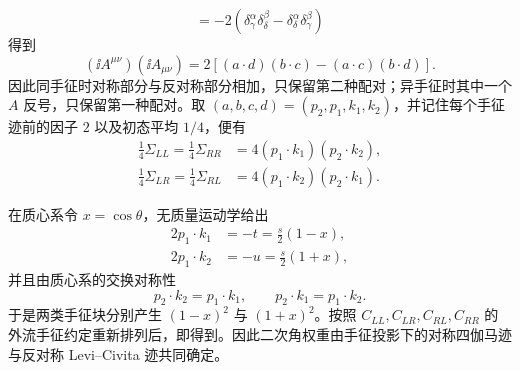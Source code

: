 \begin{derivation}[手征系数的自旋求和与角分布]
\begin{equation*}
=-2\left(\delta^\alpha_{\gamma}\delta^\beta_{\delta}
-\delta^\alpha_{\delta}\delta^\beta_{\gamma}\right)
\end{equation*}
得到
\begin{equation*}
(\ii A^{\mu\nu})(\ii A_{\mu\nu})
=2\left[(a\cdot d)(b\cdot c)-(a\cdot c)(b\cdot d)\right].
\end{equation*}
因此同手征时对称部分与反对称部分相加，只保留第二种配对；异手征时其中一个 $A$ 反号，只保留第一种配对。取
$(a,b,c,d)=(p_2,p_1,k_1,k_2)$，并记住每个手征迹前的因子 $2$ 以及初态平均 $1/4$，便有
\begin{align*}
\frac14\Sigma_{LL}
=\frac14\Sigma_{RR}
&=4(p_1\cdot k_1)(p_2\cdot k_2),\\
\frac14\Sigma_{LR}
=\frac14\Sigma_{RL}
&=4(p_1\cdot k_2)(p_2\cdot k_1).
\end{align*}

在质心系令 $x=\cos\theta$，无质量运动学给出
\begin{align*}
2p_1\cdot k_1&=-t=\frac{s}{2}(1-x),\\
2p_1\cdot k_2&=-u=\frac{s}{2}(1+x),
\end{align*}
并且由质心系的交换对称性
\begin{equation*}
p_2\cdot k_2=p_1\cdot k_1,
\qquad
p_2\cdot k_1=p_1\cdot k_2.
\end{equation*}
于是两类手征块分别产生 $(1-x)^2$ 与 $(1+x)^2$。按照 $C_{LL},C_{LR},C_{RL},C_{RR}$ 的外流手征约定重新排列后，即得到。因此二次角权重由手征投影下的对称四伽马迹与反对称 Levi--Civita 迹共同确定。
\end{derivation}

